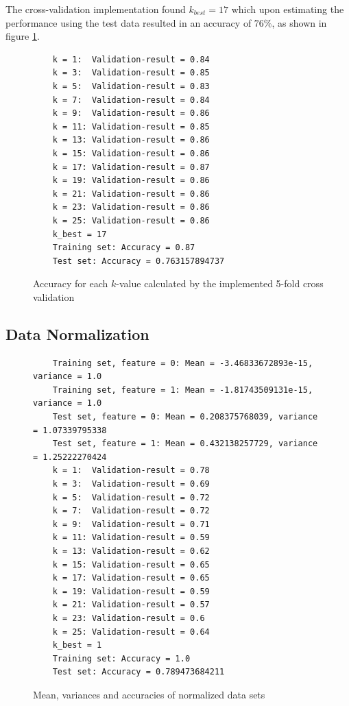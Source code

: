 \documentclass[a4paper]{article}
\begin{document}
The cross-validation implementation found $k_{best} = 17$ which upon estimating the performance using the test data resulted in an accuracy of $76\%$, as shown in figure \ref{fig:5-fold_results}. 

\begin{figure}[H]
	\begin{lstlisting}
	k = 1:  Validation-result = 0.84
	k = 3:  Validation-result = 0.85
	k = 5:  Validation-result = 0.83
	k = 7:  Validation-result = 0.84
	k = 9:  Validation-result = 0.86
	k = 11: Validation-result = 0.85
	k = 13: Validation-result = 0.86
	k = 15: Validation-result = 0.86
	k = 17: Validation-result = 0.87
	k = 19: Validation-result = 0.86
	k = 21: Validation-result = 0.86
	k = 23: Validation-result = 0.86
	k = 25: Validation-result = 0.86
	k_best = 17
	Training set: Accuracy = 0.87
	Test set: Accuracy = 0.763157894737
	\end{lstlisting}
	\caption{Accuracy for each $k$-value calculated by the implemented 5-fold cross validation}
	\label{fig:5-fold_results}
\end{figure}

\subsection{Data Normalization}


\begin{figure}[H]
	\begin{lstlisting}
	Training set, feature = 0: Mean = -3.46833672893e-15, variance = 1.0
	Training set, feature = 1: Mean = -1.81743509131e-15, variance = 1.0
	Test set, feature = 0: Mean = 0.208375768039, variance = 1.07339795338
	Test set, feature = 1: Mean = 0.432138257729, variance = 1.25222270424
	k = 1:  Validation-result = 0.78
	k = 3:  Validation-result = 0.69
	k = 5:  Validation-result = 0.72
	k = 7:  Validation-result = 0.72
	k = 9:  Validation-result = 0.71
	k = 11: Validation-result = 0.59
	k = 13: Validation-result = 0.62
	k = 15: Validation-result = 0.65
	k = 17: Validation-result = 0.65
	k = 19: Validation-result = 0.59
	k = 21: Validation-result = 0.57
	k = 23: Validation-result = 0.6
	k = 25: Validation-result = 0.64
	k_best = 1
	Training set: Accuracy = 1.0
	Test set: Accuracy = 0.789473684211
	\end{lstlisting}
	\caption{Mean, variances and accuracies of normalized data sets}
	\label{fig:normalization_results}
\end{figure}
\end{document}
